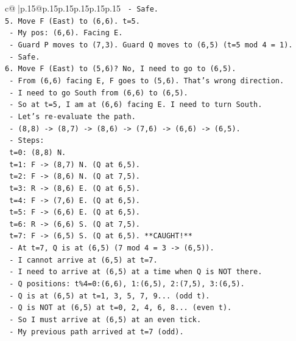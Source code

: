 \documentclass{article}
\begin{document}
{\begin{supertabular}{c@{$\;$}|p{.15\linewidth}@{}p{.15\linewidth}p{.15\linewidth}p{.15\linewidth}p{.15\linewidth}p{.15\linewidth}}
{{{\texttt{   {-} Safe.} \\
\texttt{5. Move F (East) to (6,6). t=5.} \\
\texttt{   {-} My pos: (6,6). Facing E.} \\
\texttt{   {-} Guard P moves to (7,3). Guard Q moves to (6,5) (t=5 mod 4 = 1).} \\
\texttt{   {-} Safe.} \\
\texttt{6. Move F (East) to (5,6)? No, I need to go to (6,5).} \\
\texttt{   {-} From (6,6) facing E, F goes to (5,6). That's wrong direction.} \\
\texttt{   {-} I need to go South from (6,6) to (6,5).} \\
\texttt{   {-} So at t=5, I am at (6,6) facing E. I need to turn South.} \\
\texttt{   {-} Let's re{-}evaluate the path.} \\
\texttt{   {-} (8,8) {-}> (8,7) {-}> (8,6) {-}> (7,6) {-}> (6,6) {-}> (6,5).} \\
\texttt{   {-} Steps:} \\
\texttt{     t=0: (8,8) N.} \\
\texttt{     t=1: F {-}> (8,7) N. (Q at 6,5).} \\
\texttt{     t=2: F {-}> (8,6) N. (Q at 7,5).} \\
\texttt{     t=3: R {-}> (8,6) E. (Q at 6,5).} \\
\texttt{     t=4: F {-}> (7,6) E. (Q at 6,5).} \\
\texttt{     t=5: F {-}> (6,6) E. (Q at 6,5).} \\
\texttt{     t=6: R {-}> (6,6) S. (Q at 7,5).} \\
\texttt{     t=7: F {-}> (6,5) S. (Q at 6,5). **CAUGHT!**} \\
\texttt{   {-} At t=7, Q is at (6,5) (7 mod 4 = 3 {-}> (6,5)).} \\
\texttt{   {-} I cannot arrive at (6,5) at t=7.} \\
\texttt{   {-} I need to arrive at (6,5) at a time when Q is NOT there.} \\
\texttt{   {-} Q positions: t\%4=0:(6,6), 1:(6,5), 2:(7,5), 3:(6,5).} \\
\texttt{   {-} Q is at (6,5) at t=1, 3, 5, 7, 9... (odd t).} \\
\texttt{   {-} Q is NOT at (6,5) at t=0, 2, 4, 6, 8... (even t).} \\
\texttt{   {-} So I must arrive at (6,5) at an even tick.} \\
\texttt{   {-} My previous path arrived at t=7 (odd).} \\
}}}
\end{supertabular}}
\end{document}
